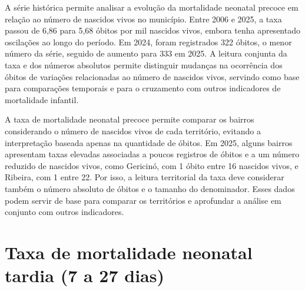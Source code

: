 
A série histórica permite analisar a evolução da mortalidade neonatal precoce em relação ao número de nascidos vivos no município. Entre 2006 e 2025, a taxa passou de 6,86 para 5,68 óbitos por mil nascidos vivos, embora tenha apresentado oscilações ao longo do período. Em 2024, foram registrados 322 óbitos, o menor número da série, seguido de aumento para 333 em 2025. A leitura conjunta da taxa e dos números absolutos permite distinguir mudanças na ocorrência dos óbitos de variações relacionadas ao número de nascidos vivos, servindo como base para comparações temporais e para o cruzamento com outros indicadores de mortalidade infantil.


A taxa de mortalidade neonatal precoce permite comparar os bairros considerando o número de nascidos vivos de cada território, evitando a interpretação baseada apenas na quantidade de óbitos. Em 2025, alguns bairros apresentam taxas elevadas associadas a poucos registros de óbitos e a um número reduzido de nascidos vivos, como Gericinó, com 1 óbito entre 16 nascidos vivos, e Ribeira, com 1 entre 22. Por isso, a leitura territorial da taxa deve considerar também o número absoluto de óbitos e o tamanho do denominador. Esses dados podem servir de base para comparar os territórios e aprofundar a análise em conjunto com outros indicadores.


\section{Taxa de mortalidade neonatal tardia (7 a 27 dias)}


